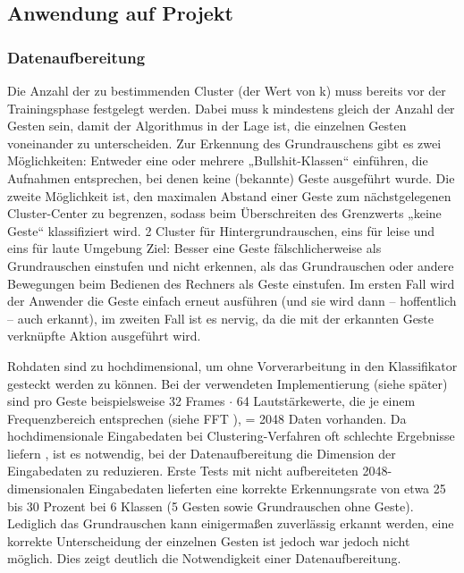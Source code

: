 \subsection{Anwendung auf Projekt}


\subsubsection{Datenaufbereitung}
Die Anzahl der zu bestimmenden Cluster (der Wert von k) muss bereits vor der Trainingsphase festgelegt werden. Dabei muss k mindestens gleich der Anzahl der Gesten sein, damit der Algorithmus in der Lage ist, die einzelnen Gesten voneinander zu unterscheiden. Zur Erkennung des Grundrauschens gibt es zwei Möglichkeiten: Entweder eine oder mehrere „Bullshit-Klassen“ einführen, die Aufnahmen entsprechen, bei denen keine (bekannte) Geste ausgeführt wurde. Die zweite Möglichkeit ist, den maximalen Abstand einer Geste zum nächstgelegenen Cluster-Center zu begrenzen, sodass beim Überschreiten des Grenzwerts „keine Geste“ klassifiziert wird.
2 Cluster für Hintergrundrauschen, eins für leise und eins für laute Umgebung
Ziel: Besser eine Geste fälschlicherweise als Grundrauschen einstufen und nicht erkennen, als das Grundrauschen oder andere Bewegungen beim Bedienen des Rechners als Geste einstufen. Im ersten Fall wird der Anwender die Geste einfach erneut ausführen (und sie wird dann – hoffentlich – auch erkannt), im zweiten Fall ist es nervig, da die mit der erkannten Geste verknüpfte Aktion ausgeführt wird. 

Rohdaten sind zu hochdimensional, um ohne Vorverarbeitung in den Klassifikator gesteckt werden zu können. Bei der verwendeten Implementierung (siehe später) sind pro Geste beispielsweise 32 Frames $\cdot$ 64 Lautstärkewerte, die je einem Frequenzbereich entsprechen (siehe FFT \cite{fftMathebuch}), = 2048 Daten vorhanden. Da hochdimensionale Eingabedaten bei Clustering-Verfahren oft schlechte Ergebnisse liefern \cite{kMeansHighDimensions}, ist es notwendig, bei der Datenaufbereitung die Dimension der Eingabedaten zu reduzieren. Erste Tests mit nicht aufbereiteten 2048-dimensionalen Eingabedaten lieferten eine korrekte Erkennungsrate von etwa 25 bis 30 Prozent bei 6 Klassen (5 Gesten sowie Grundrauschen ohne Geste). Lediglich das Grundrauschen kann einigermaßen zuverlässig erkannt werden, eine korrekte Unterscheidung der einzelnen Gesten ist jedoch war jedoch nicht möglich. Dies zeigt deutlich die Notwendigkeit einer Datenaufbereitung.


